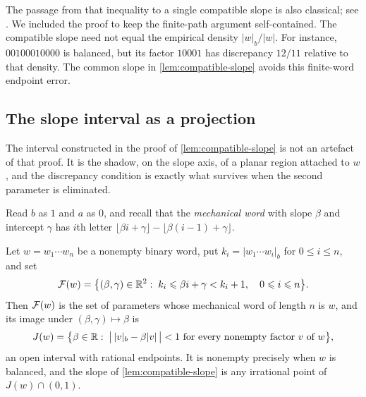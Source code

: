 The passage from that inequality to a single compatible slope is also
classical; see \cite[Chapter~2]{Lothaire2002}. We included the proof to
keep the finite-path argument self-contained. The compatible slope need not equal the empirical density
$|w|_b/|w|$. For instance, $00100010000$ is balanced, but its factor $10001$
has discrepancy $12/11$ relative to that density. The common slope in
\cref{lem:compatible-slope} avoids this finite-word endpoint error.

\subsection{The slope interval as a projection}

The interval constructed in the proof of \cref{lem:compatible-slope} is not
an artefact of that proof. It is the shadow, on the slope axis, of a planar
region attached to $w$, and the discrepancy condition is exactly what
survives when the second parameter is eliminated.

Read $b$ as $1$ and $a$ as $0$, and recall that the \emph{mechanical word}
with slope $\beta$ and intercept $\gamma$ has $i$th letter
$\lfloor\beta i+\gamma\rfloor-\lfloor\beta(i-1)+\gamma\rfloor$.

\begin{proposition}
\label{prop:slope-projection}
Let $w=w_1\cdots w_n$ be a nonempty binary word, put
$k_i=\lvert w_1\cdots w_i\rvert_b$ for $0\leqslant i\leqslant n$, and set
\begin{equation}
 \mathcal{F}(w)=\bigl\{(\beta,\gamma)\in\mathbb{R}^2:\;
   k_i\leqslant\beta i+\gamma<k_i+1,\quad 0\leqslant i\leqslant n\bigr\}.
 \label{eq:parameter-region}
\end{equation}
Then $\mathcal{F}(w)$ is the set of parameters whose mechanical word of length $n$
is $w$, and its image under $(\beta,\gamma)\mapsto\beta$ is
\begin{equation}
 J(w)=\bigl\{\beta\in\mathbb{R}:\;
   \bigl\lvert\,\lvert v\rvert_b-\beta\lvert v\rvert\,\bigr\rvert<1
   \text{ for every nonempty factor }v\text{ of }w\bigr\},
 \label{eq:slope-interval}
\end{equation}
an open interval with rational endpoints. It is nonempty precisely when $w$
is balanced, and the slope of \cref{lem:compatible-slope} is any irrational
point of $J(w)\cap(0,1)$.
\end{proposition}

